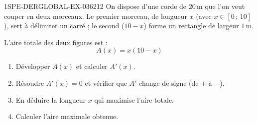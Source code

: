 \begin{exercice}{1SPE-DERGLOBAL-EX-036}{2}{12}
On dispose d'une corde de $20\,\text{m}$ que l'on veut couper en deux morceaux. Le premier morceau, de longueur $x$ (avec $x \in [0\,;\,10]$), sert à délimiter un carré ; le second ($10 - x$) forme un rectangle de largeur $1\,\text{m}$.

L'aire totale des deux figures est :
\[
A(x) = x(10 - x)
\]

\begin{enumerate}
\item Développer $A(x)$ et calculer $A'(x)$.
\item Résoudre $A'(x) = 0$ et vérifier que $A'$ change de signe (de $+$ à $-$).
\item En déduire la longueur $x$ qui maximise l'aire totale.
\item Calculer l'aire maximale obtenue.
\end{enumerate}
\end{exercice}
